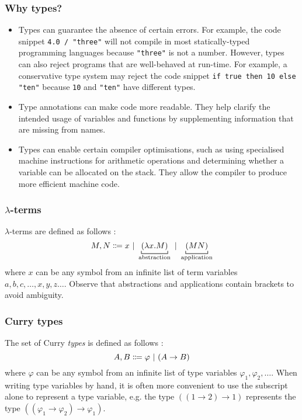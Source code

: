 \subsubsection{Why types?}
\begin{itemize}
    \item Types can guarantee the absence of certain errors. For example, the code snippet \lstinline{4.0 / "three"} will not compile in most statically-typed programming languages because \lstinline{"three"} is not a number. However, types can also reject programs that are well-behaved at run-time. For example, a conservative type system may reject the code snippet \lstinline{if true then 10 else "ten"} because \lstinline{10} and \lstinline{"ten"} have different types.
    \item Type annotations can make code more readable. They help clarify the intended usage of variables and functions by supplementing information that are missing from names.
    \item Types can enable certain compiler optimisations, such as using specialised machine instructions for arithmetic operations and determining whether a variable can be allocated on the stack. They allow the compiler to produce more efficient machine code.
\end{itemize}

\subsubsection{\texorpdfstring{$\lambda$}{Lambda}-terms}
\label{lambda:lambda-terms}
$\lambda$-terms are defined as follows \cite{church:1941}:
\[
    M,N \Coloneqq x \alt \underbracket[0.6pt]{(\lambda x. M)}_\text{abstraction} \alt \underbracket[0.6pt]{(MN)}_\text{application}
\]
where $x$ can be any symbol from an infinite list of term variables $a, b, c, \ldots, x, y, z \ldots$. Observe that abstractions and applications contain brackets to avoid ambiguity.

\subsubsection{Curry types}
\label{lambda:curry-types}
The set of Curry \textit{types} is defined as follows \cite{van-bakel:2022}:
\[
    A, B \Coloneqq \varphi \ |\  (A \rightarrow B)
\]
where $\varphi$ can be any symbol from an infinite list of type variables $\varphi_1, \varphi_2, \ldots$. When writing type variables by hand, it is often more convenient to use the subscript alone to represent a type variable, e.g. the type $((1 \rightarrow 2) \rightarrow 1)$ represents the type $((\varphi_1 \rightarrow \varphi_2) \rightarrow \varphi_1)$.

